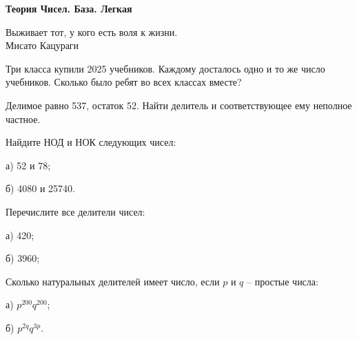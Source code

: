 \centerline{\bf \Huge Теория Чисел. База. Легкая}

\begin{flushright}
        \scriptsize{Выживает тот, у кого есть воля к жизни.\\ Мисато Кацураги}
\end{flushright}

  Три класса купили 2025 учебников. Каждому досталось одно и то же число учебников. Сколько было ребят во всех классах вместе?

 Делимое равно 537, остаток 52. Найти делитель и соответствующее ему неполное частное.

 Найдите НОД и НОК следующих чисел:

а) 52 и 78;

б) 4080 и 25740.


 Перечислите все делители чисел: 

а) 420;

б) 3960; 


Сколько натуральных делителей имеет число, если \(p\) и \(q\) – простые числа: 

а) \(p^{200}q^{200}\);

б) \(p^{2q}q^{3p}\).